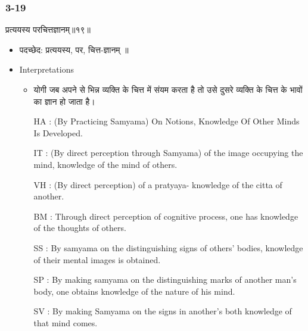 \begin{frame}[fragile]\frametitle{3-19}
\begin{sanskrit}
प्रत्ययस्य परचित्तज्ञानम्॥१९॥
\end{sanskrit}

	\begin{itemize}
	\item पदच्छेद:  प्रत्ययस्य, पर, चित्त-ज्ञानम् ॥
	\item Interpretations
		\begin{itemize}	
		\item योगी जब अपने से भिन्न व्यक्ति के चित्त में संयम करता है तो उसे दुसरे व्यक्ति के चित्त के भावों का ज्ञान हो जाता है।
		\item [HA]: (By Practicing Samyama) On Notions, Knowledge Of Other Minds Is Developed.
		\item [IT]: (By direct perception through Samyama) of the image occupying the mind, knowledge of the mind of others.
		\item [VH]: (By direct perception) of a pratyaya- knowledge of the citta of another.
		\item [BM]: Through direct perception of cognitive process, one has knowledge of the thoughts of others.
		\item [SS]: By samyama on the distinguishing signs of others’ bodies, knowledge of their mental images is obtained.
		\item [SP]: By making samyama on the distinguishing marks of another man’s body, one obtains knowledge of the nature of his mind.
		\item [SV]: By making Samyama on the signs in another’s both knowledge of that mind comes. 
		\end{itemize}
	\end{itemize}
\end{frame}


